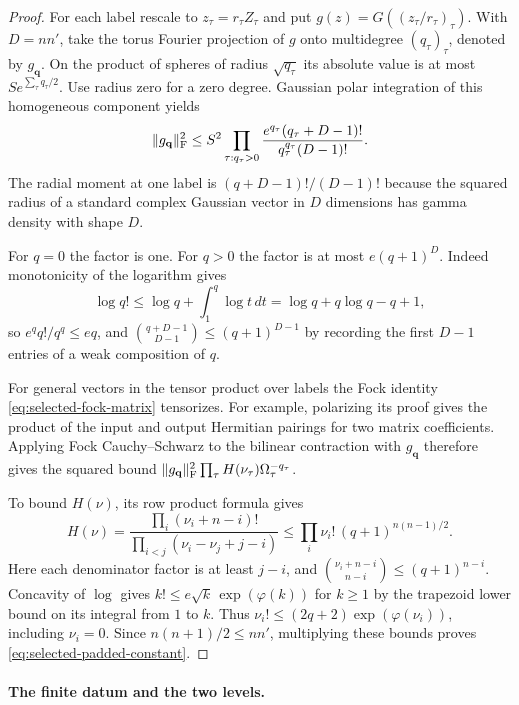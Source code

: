 \begin{proof}
For each label rescale to \(z_\tau=r_\tau Z_\tau\) and put
\(g(z)=G((z_\tau/r_\tau)_\tau)\). With \(D=nn'\), take
the torus Fourier projection of \(g\) onto multidegree
\((q_\tau)_\tau\), denoted by \(g_{\mathbf q}\). On the
product of spheres of radius \(\sqrt{q_\tau}\) its
absolute value is at most \(S e^{\sum_\tau q_\tau/2}\).
Use radius zero for a zero degree. Gaussian polar
integration of this homogeneous component yields
\[
 \|g_{\mathbf q}\|_{\rm F}^2
 \le S^2\prod_{\tau:q_\tau>0}
 \frac{e^{q_\tau}(q_\tau+D-1)!}
      {q_\tau^{q_\tau}(D-1)!}.
\]
The radial moment at one label is
\((q+D-1)!/(D-1)!\) because the squared radius of a standard
complex Gaussian vector in \(D\) dimensions has gamma
density with shape \(D\).

For \(q=0\) the factor is one.
For \(q>0\) the factor is at most \(e(q+1)^D\).
Indeed monotonicity of the logarithm gives
\[
 \log q!\le\log q+\int_1^q\log t\,dt
            =\log q+q\log q-q+1 ,
\]
so \(e^q q!/q^q\le eq\), and
\(\binom{q+D-1}{D-1}\le(q+1)^{D-1}\) by recording the first
\(D-1\) entries of a weak composition of \(q\).

For general vectors in the tensor product over labels the
Fock identity \eqref{eq:selected-fock-matrix} tensorizes.
For example, polarizing its proof gives the product of the
input and output Hermitian pairings for two matrix
coefficients. Applying Fock Cauchy--Schwarz to the bilinear
contraction with \(g_{\mathbf q}\) therefore gives the
squared bound \(\|g_{\mathbf q}\|_{\rm F}^2
\prod_\tau H(\nu_\tau)\Omega_\tau^{-q_\tau}\).

To bound \(H(\nu)\), its row product formula gives
\[
 H(\nu)=\frac{\prod_i(\nu_i+n-i)!}
               {\prod_{i<j}(\nu_i-\nu_j+j-i)}
 \le \prod_i \nu_i!\,(q+1)^{n(n-1)/2}.
\]
Here each denominator factor is at least \(j-i\), and
\(\binom{\nu_i+n-i}{n-i}\le(q+1)^{n-i}\).
Concavity of \(\log\) gives
\(k!\le e\sqrt{k}\,\exp(\varphi(k))\) for \(k\ge1\)
by the trapezoid lower bound on its integral from \(1\)
to \(k\). Thus
\(\nu_i!\le(2q+2)\exp(\varphi(\nu_i))\), including
\(\nu_i=0\). Since \(n(n+1)/2\le nn'\), multiplying
these bounds proves \eqref{eq:selected-padded-constant}.
\end{proof}

\paragraph{The finite datum and the two levels.}

